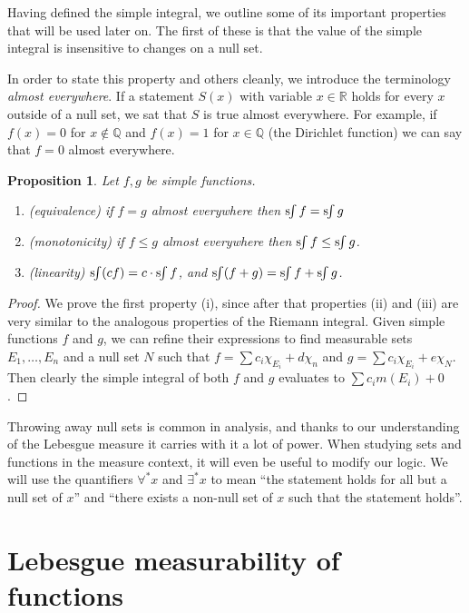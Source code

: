 \documentclass[11pt,oneside]{amsbook}
\newcommand{\QQ}{{\mathbb Q}}
\newcommand{\RR}{{\mathbb R}}
\newcommand{\sint}{\text{s}\kern-3pt\int}
\theoremstyle{definition}
\theoremstyle{plain}
\newtheorem{prop}[thm]{Proposition}
\theoremstyle{definition}
\theoremstyle{remark}
\numberwithin{equation}{section}
\numberwithin{figure}{section}
\begin{document}
Having defined the simple integral, we outline some of its important properties that will be used later on. The first of these is that the value of the simple integral is insensitive to changes on a null set.

In order to state this property and others cleanly, we introduce the terminology \emph{almost everywhere}. If a statement $S(x)$ with variable $x\in\RR$ holds for every $x$ outside of a null set, we sat that $S$ is true almost everywhere. For example, if $f(x)=0$ for $x\notin\QQ$ and $f(x)=1$ for $x\in\QQ$ (the Dirichlet function) we can say that $f=0$ almost everywhere.

\begin{prop}
  Let $f,g$ be simple functions.
  \begin{enumerate}
  \item (equivalence) if $f=g$ almost everywhere then $\sint f=\sint g$
  \item (monotonicity) if $f\leq g$ almost everywhere then $\sint f\leq\sint g$.
  \item (linearity) $\sint (cf)=c\cdot\sint f$, and $\sint (f+g)=\sint f+\sint g$.
  \end{enumerate}
\end{prop}

\begin{proof}
  We prove the first property (i), since after that properties (ii) and (iii) are very similar to the analogous properties of the Riemann integral. Given simple functions $f$ and $g$, we can refine their expressions to find measurable sets $E_1,\ldots,E_n$ and a null set $N$ such that $f=\sum c_i\chi_{E_i}+d\chi_n$ and $g=\sum c_i\chi_{E_i}+e\chi_N$. Then clearly the simple integral of both $f$ and $g$ evaluates to $\sum c_im(E_i)+0$.
\end{proof}

Throwing away null sets is common in analysis, and thanks to our understanding of the Lebesgue measure it carries with it a lot of power. When studying sets and functions in the measure context, it will even be useful to modify our logic. We will use the quantifiers $\forall^*x$ and $\exists^*x$ to mean ``the statement holds for all but a null set of $x$'' and ``there exists a non-null set of $x$ such that the statement holds''.

\newpage
\section{Lebesgue measurability of functions}
\end{document}
